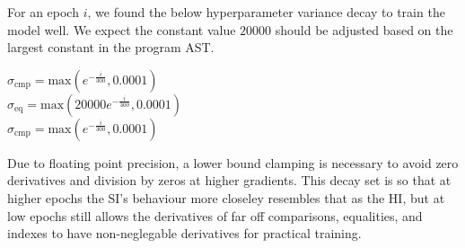 \documentclass{article}
\begin{document}
For an epoch $i$, we found the below hyperparameter variance decay to train the model well. We expect the constant value $20000$ should be adjusted based on the largest constant in the program AST.
\begin{center}
  $\sigma_{\text{cmp}} = \text{max}(e^{-\frac{i}{300}}, 0.0001)$\\
  $\sigma_{\text{eq}} = \text{max}(20000e^{-\frac{i}{300}}, 0.0001)$\\
  $\sigma_{\text{cmp}} = \text{max}(e^{-\frac{i}{300}}, 0.0001)$\\
\end{center}
Due to floating point precision, a lower bound clamping is necessary to avoid zero derivatives and division by zeros at higher gradients. This decay set is so that at higher epochs the SI's behaviour more closeley resembles that as the HI, but at low epochs still allows the derivatives of far off comparisons, equalities, and indexes to have non-neglegable derivatives for practical training. 


\end{document}
